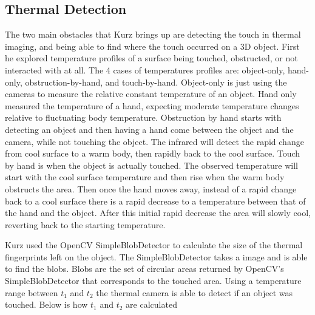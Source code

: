\documentclass{sig-alternate}
\begin{document}


\subsection{Thermal Detection}
\label{Thermal Detection}
The two main obstacles that Kurz brings up are detecting the touch in thermal imaging, and being able to find where the touch occurred on a 3D object. First he explored temperature profiles of a surface being touched, obstructed, or not interacted with at all. The 4 cases of temperatures profiles are: object-only, hand-only, obstruction-by-hand, and touch-by-hand. Object-only is just using the cameras to measure the relative constant temperature of an object. Hand only measured the temperature of a hand, expecting moderate temperature changes relative to fluctuating body temperature. Obstruction by hand starts with detecting an object and then having a hand come between the object and the camera, while not touching the object. The infrared will detect the rapid change from cool surface to a warm body, then rapidly back to the cool surface. Touch by hand is when the object is actually touched. The observed temperature  will start with the cool surface temperature and then rise when the warm body obstructs the area. Then once the hand moves away, instead of a rapid change back to a cool surface there is a rapid decrease to a temperature between that of the hand and the object. After this initial rapid decrease the area will slowly cool, reverting back to the starting temperature. 

Kurz used the OpenCV SimpleBlobDetector to calculate the size of the thermal fingerprints left on the object. The SimpleBlobDetector takes a image and is able to find the blobs. Blobs are the set of circular areas returned by OpenCV's SimpleBlobDetector that corresponds to the touched area. Using a temperature range between \(t_1\) and \(t_2\) the thermal camera is able to detect if an object was touched. Below is how \(t_1\) and \(t_2\) are calculated
\end{document}

